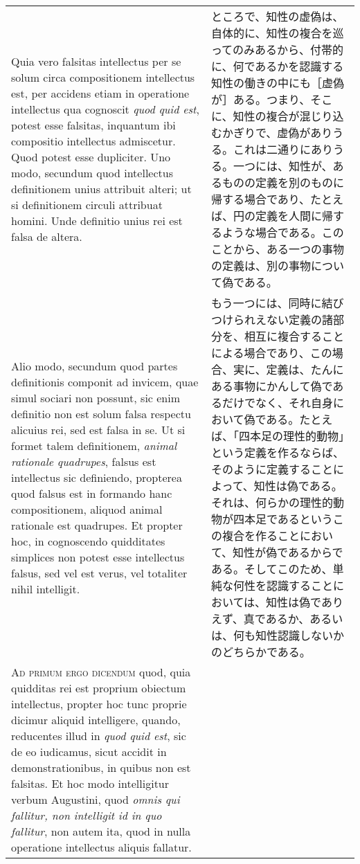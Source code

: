 \documentclass[10pt]{jsarticle} %
\begin{document}
\begin{longtable}{p{21em}p{21em}}
\\

Quia vero falsitas intellectus per se solum circa
compositionem intellectus est, per accidens etiam in operatione
intellectus qua cognoscit {\itshape quod quid est}, potest esse falsitas, inquantum
ibi compositio intellectus admiscetur. Quod potest esse dupliciter. Uno
modo, secundum quod intellectus definitionem unius attribuit alteri; ut
si definitionem circuli attribuat homini. Unde definitio unius rei est
falsa de altera. 


&

ところで、知性の虚偽は、自体的に、知性の複合を巡ってのみあるから、付帯的に、何であるかを認識する知性の働きの中にも［虚偽が］ある。つまり、そこに、知性の複合が混じり込むかぎりで、虚偽がありうる。これは二通りにありうる。一つには、知性が、あるものの定義を別のものに帰する場合であり、たとえば、円の定義を人間に帰するような場合である。このことから、ある一つの事物の定義は、別の事物について偽である。

\\



Alio modo, secundum quod partes definitionis componit
ad invicem, quae simul sociari non possunt, sic enim definitio non est
solum falsa respectu alicuius rei, sed est falsa in se. Ut si formet
talem definitionem, {\itshape animal rationale quadrupes}, falsus est intellectus
sic definiendo, propterea quod falsus est in formando hanc
compositionem, aliquod animal rationale est quadrupes. Et propter hoc,
in cognoscendo quidditates simplices non potest esse intellectus falsus,
sed vel est verus, vel totaliter nihil intelligit.


&

もう一つには、同時に結びつけられえない定義の諸部分を、相互に複合することによる場合であり、この場合、実に、定義は、たんにある事物にかんして偽であるだけでなく、それ自身において偽である。たとえば、「四本足の理性的動物」という定義を作るならば、そのように定義することによって、知性は偽である。それは、何らかの理性的動物が四本足であるというこの複合を作ることにおいて、知性が偽であるからである。そしてこのため、単純な何性を認識することにおいては、知性は偽でありえず、真であるか、あるいは、何も知性認識しないかのどちらかである。


\\


{\scshape Ad primum ergo dicendum} quod, quia quidditas
rei est proprium obiectum intellectus, propter hoc tunc proprie dicimur
aliquid intelligere, quando, reducentes illud in {\itshape quod quid est}, sic de
eo iudicamus, sicut accidit in demonstrationibus, in quibus non est
falsitas. Et hoc modo intelligitur verbum Augustini, quod {\itshape omnis qui
fallitur, non intelligit id in quo fallitur}, non autem ita, quod in
nulla operatione intellectus aliquis fallatur.


\end{longtable}
\end{document}
